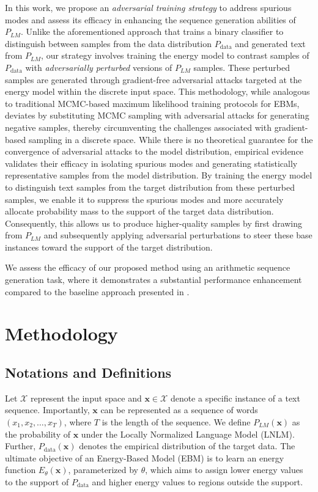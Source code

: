 \documentclass[11pt]{article}
\begin{document}
 

In this work, we propose an \emph{adversarial training strategy} to address spurious modes and assess its efficacy in enhancing the sequence generation abilities of \( P_{LM} \). Unlike the aforementioned approach that trains a binary classifier to distinguish between samples from the data distribution \( P_\text{data} \) and generated text from \( P_{LM} \), our strategy involves training the energy model to contrast samples of \( P_\text{data} \) with \emph{adversarially perturbed} versions of \( P_{LM} \) samples. These perturbed samples are generated through gradient-free adversarial attacks targeted at the energy model within the discrete input space. This methodology, while analogous to traditional MCMC-based maximum likelihood training protocols for EBMs, deviates by substituting MCMC sampling with adversarial attacks for generating negative samples, thereby circumventing the challenges associated with gradient-based sampling in a discrete space. While there is no theoretical guarantee for the convergence of adversarial attacks to the model distribution, empirical evidence validates their efficacy in isolating spurious modes and generating statistically representative samples from the model distribution. By training the energy model to distinguish text samples from the target distribution from these perturbed samples, we enable it to suppress the spurious modes and more accurately allocate probability mass to the support of the target data distribution. Consequently, this allows us to produce higher-quality samples by first drawing from \( P_{LM} \) and subsequently applying adversarial perturbations to steer these base instances toward the support of the target distribution.



We assess the efficacy of our proposed method using an arithmetic sequence generation task, where it demonstrates a substantial performance enhancement compared to the baseline approach presented in \cite{deng2019residual}.


\section{Methodology}

\subsection{Notations and Definitions}
Let \( \mathcal{X} \) represent the input space and \( \mathbf{x} \in \mathcal{X} \) denote a specific instance of a text sequence. Importantly, \( \mathbf{x} \) can be represented as a sequence of words \( (x_1, x_2, \ldots, x_T) \), where \( T \) is the length of the sequence. We define \( P_{LM}(\mathbf{x}) \) as the probability of \( \mathbf{x} \) under the Locally Normalized Language Model (LNLM). Further, \( P_\text{data}(\mathbf{x}) \) denotes the empirical distribution of the target data. The ultimate objective of an Energy-Based Model (EBM) is to learn an energy function \( E_\theta(\mathbf{x}) \), parameterized by \( \theta \), which aims to assign lower energy values to the support of \( P_\text{data} \) and higher energy values to regions outside the support.
\end{document}
